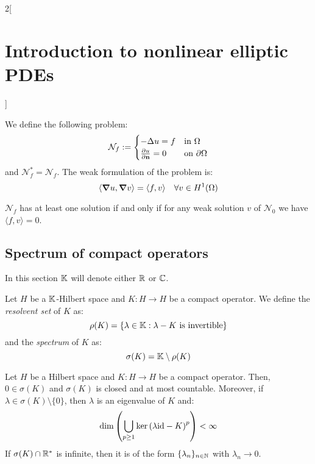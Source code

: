 \documentclass[../../../main_math.tex]{subfiles}
\begin{document}
\begin{multicols}{2}[\section{Introduction to nonlinear elliptic PDEs}]
\begin{proposition}
  \end{proposition}
  \begin{definition}
    We define the following problem:
    $$
      \mathcal{N}_f:=\begin{cases}
        -\Delta u=f   & \text{in }\Omega         \\
        \pdv{u}{\boldsymbol{\mathrm{n}}}=0 & \text{on }\partial\Omega
      \end{cases}
    $$
    and $\mathcal{N}_f^*=\mathcal{N}_f$. The weak formulation of the problem is:
    \begin{equation*}
      \langle \grad u,\grad v\rangle=\langle f,v\rangle\quad \forall v\in H^1(\Omega)
    \end{equation*}
  \end{definition}
  \begin{proposition}
    $\mathcal{N}_f$ has at least one solution if and only if for any weak solution $v$ of $\mathcal{N}_0$ we have $\langle f,v\rangle=0$.
  \end{proposition}
  \subsection{Spectrum of compact operators}
  In this section $\mathbb{K}$ will denote either $\mathbb{R}$ or $\mathbb{C}$.
  \begin{definition}
    Let $H$ be a $\mathbb{K}$-Hilbert space and $K:H\to H$ be a compact operator. We define the \emph{resolvent set} of $K$ as:
    $$
      \rho(K)=\{\lambda\in \mathbb{K}: \lambda-K \text{ is invertible}\}
    $$
    and the \emph{spectrum} of $K$ as:
    $$
      \sigma(K)=\mathbb{K}\setminus \rho(K)
    $$
  \end{definition}
  \begin{theorem}
    Let $H$ be a Hilbert space and $K:H\to H$ be a compact operator. Then, $0\in \sigma(K)$ and $\sigma(K)$ is closed and at most countable. Moreover, if $\lambda\in \sigma(K)\setminus\{0\}$, then $\lambda$ is an eigenvalue of $K$ and:
    $$
      \dim\left(\bigcup_{p\geq 1}\ker{(\lambda\mathrm{id}-K)}^p\right)<\infty
    $$
    If $\sigma(K)\cap\mathbb{R}^*$ is infinite, then it is of the form $\{\lambda_n\}_{n\in \mathbb{N}}$ with $\lambda_n\to 0$.
  \end{theorem}
\end{multicols}
\end{document}
